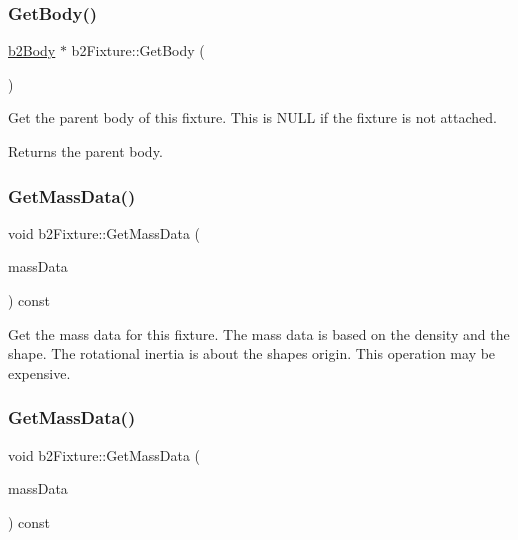 \subsubsection{\texorpdfstring{Get\+Body()}{GetBody()}\hspace{0.1cm}{\footnotesize\ttfamily [2/2]}}
{\footnotesize\ttfamily \hyperlink{classb2Body}{b2\+Body} $\ast$ b2\+Fixture\+::\+Get\+Body (\begin{DoxyParamCaption}{ }\end{DoxyParamCaption})\hspace{0.3cm}{\ttfamily [inline]}}

Get the parent body of this fixture. This is N\+U\+LL if the fixture is not attached. \begin{DoxyReturn}{Returns}
the parent body. 
\end{DoxyReturn}
\mbox{\label{classb2Fixture_a4532a12e848c5ceb5a3b94cf45b7cbad}} 
\subsubsection{\texorpdfstring{Get\+Mass\+Data()}{GetMassData()}\hspace{0.1cm}{\footnotesize\ttfamily [1/2]}}
{\footnotesize\ttfamily void b2\+Fixture\+::\+Get\+Mass\+Data (\begin{DoxyParamCaption}\item[{\hyperlink{structb2MassData}{b2\+Mass\+Data} $\ast$}]{mass\+Data }\end{DoxyParamCaption}) const\hspace{0.3cm}{\ttfamily [inline]}}

Get the mass data for this fixture. The mass data is based on the density and the shape. The rotational inertia is about the shape\textquotesingle{}s origin. This operation may be expensive. \mbox{\label{classb2Fixture_a4532a12e848c5ceb5a3b94cf45b7cbad}} 
\subsubsection{\texorpdfstring{Get\+Mass\+Data()}{GetMassData()}\hspace{0.1cm}{\footnotesize\ttfamily [2/2]}}
{\footnotesize\ttfamily void b2\+Fixture\+::\+Get\+Mass\+Data (\begin{DoxyParamCaption}\item[{\hyperlink{structb2MassData}{b2\+Mass\+Data} $\ast$}]{mass\+Data }\end{DoxyParamCaption}) const}

